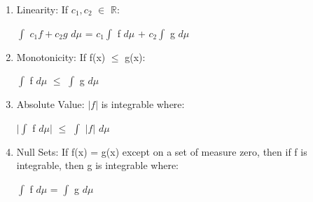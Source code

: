    \begin{enumerate}[label=(\alph*), leftmargin=2cm, itemsep=0.1cm]
        \item {\color{lgreen} Linearity}:
            If $c_1,c_2$ $\in$ $\mathbb{R}$:

            \hspace{0.5cm}
            $\int$ $c_1f + c_2g$ $d\mu$
            = $c_1 \int$ f $d\mu$ + $c_2 \int$ g $d\mu$

        \item {\color{lgreen} Monotonicity}:
            If f(x) $\leq$ g(x):

            \hspace{0.5cm}
            $\int$ f $d\mu$ $\leq$ $\int$ g $d\mu$

        \item {\color{lgreen} Absolute Value}:
            $|f|$ is integrable where:

            \hspace{0.5cm}
            $|\int$ f $d\mu|$
            $\leq$ $\int$ $|f|$ $d\mu$

        \item {\color{lgreen} Null Sets}:
            If f(x) = g(x) except on a set of measure zero,
            then if f is integrable, then g is integrable where:

            \hspace{0.5cm}
            $\int$ f $d\mu$ = $\int$ g $d\mu$
    \end{enumerate}




    